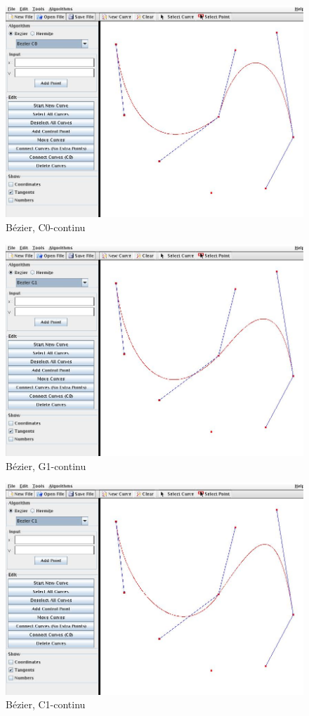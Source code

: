 \documentclass[a4paper,11pt,oneside, titlepage]{article}
\begin{document}
\begin{figure}[htbp]
\centering
\includegraphics[scale=0.4]{./screenies/bezierC0.jpg}
\caption{B\'ezier, C0-continu}\label{iC0}
\end{figure}
\begin{figure}[htbp]
\centering
\includegraphics[scale=0.4]{./screenies/bezierG1.jpg}
\caption{B\'ezier, G1-continu}\label{iG1}
\end{figure}
\begin{figure}[htbp]
\centering
\includegraphics[scale=0.4]{./screenies/bezierC1.jpg}
\caption{B\'ezier, C1-continu}\label{iC1}
\end{figure}
\end{document}
